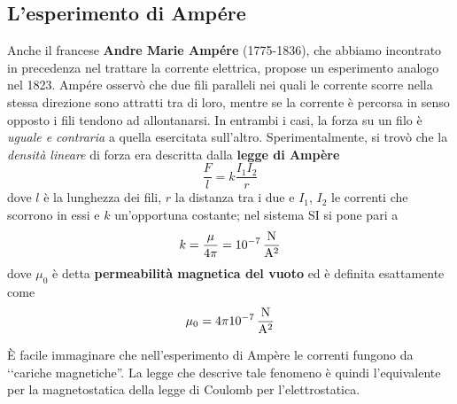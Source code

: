 \subsection{L'esperimento di Ampére}
Anche il francese \textbf{Andre Marie Ampére} (1775-1836), che abbiamo incontrato in precedenza nel trattare la corrente elettrica, propose un esperimento analogo nel 1823. %
Ampére osservò che due fili paralleli nei quali le corrente scorre nella stessa direzione sono attratti tra di loro, mentre se la corrente è percorsa in senso opposto i fili tendono ad allontanarsi. In entrambi i casi, la forza su un filo è \textit{uguale e contraria} a quella esercitata sull'altro.
Sperimentalmente, si trovò che la \textit{densità lineare} di forza era descritta dalla \textbf{legge di Ampère}
\begin{equation}
	\frac{F}{l}=k\frac{I_1I_2}{r}
\end{equation}
dove $l$ è la lunghezza dei fili, $r$ la distanza tra i due e $I_1$, $I_2$ le correnti che scorrono in essi e $k$ un'opportuna costante; nel sistema SI si pone pari a
\begin{equation}
	k=\frac{\mu}{4\pi}=\SI[per-mode = fraction]{d-7}{\newton\per\ampere\squared}
\end{equation}
dove $\mu_0$ è detta \textbf{permeabilità magnetica del vuoto} ed è definita esattamente come
\begin{equation}
	\mu_0=4\pi\SI[per-mode = fraction]{d-7}{\newton\per\ampere\squared}
\end{equation}

È facile immaginare che nell'esperimento di Ampère le correnti fungono da ‘‘cariche magnetiche''. La legge che descrive tale fenomeno è quindi l'equivalente per la magnetostatica della legge di Coulomb per l'elettrostatica.
